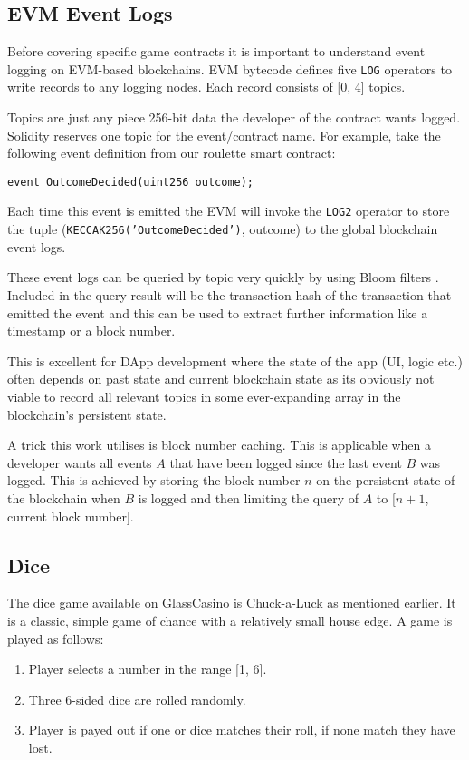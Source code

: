 \documentclass[10pt,journal,compsoc]{IEEEtran}
\begin{document}
\subsection{EVM Event Logs}
\label{sec:evmlogs}
Before covering specific game contracts it is important to understand event logging on EVM-based blockchains. EVM bytecode defines five \texttt{LOG} operators to write records to any logging nodes. Each record consists of [0, 4] topics.

Topics are just any piece 256-bit data the developer of the contract wants logged. Solidity reserves one topic for the event/contract name. For example, take the following event definition from our roulette smart contract:
\begin{center}
    \texttt{event OutcomeDecided(uint256 outcome);}
\end{center}
Each time this event is emitted the EVM will invoke the \texttt{LOG2} operator to store the tuple (\texttt{KECCAK256('OutcomeDecided')}, outcome) to the global blockchain event logs.

These event logs can be queried by topic very quickly by using Bloom filters \cite{bloom1970space}. Included in the query result will be the transaction hash of the transaction that emitted the event and this can be used to extract further information like a timestamp or a block number.

This is excellent for DApp development where the state of the app (UI, logic etc.) often depends on past state and current blockchain state as its obviously not viable to record all relevant topics in some ever-expanding array in the blockchain's persistent state.

A trick this work utilises is block number caching. This is applicable when a developer wants all events $A$ that have been logged since the last event $B$ was logged. This is achieved by storing the block number $n$ on the persistent state of the blockchain when $B$ is logged and then limiting the query of $A$ to [$n + 1$, current block number]. 

\subsection{Dice}
The dice game available on GlassCasino is Chuck-a-Luck as mentioned earlier. It is a classic, simple game of chance with a relatively small house edge. A game is played as follows:
\begin{enumerate}
    \item Player selects a number in the range [1, 6].
    \item Three 6-sided dice are rolled randomly.
    \item Player is payed out if one or dice matches their roll, if none match they have lost.
\end{enumerate}
\end{document}

